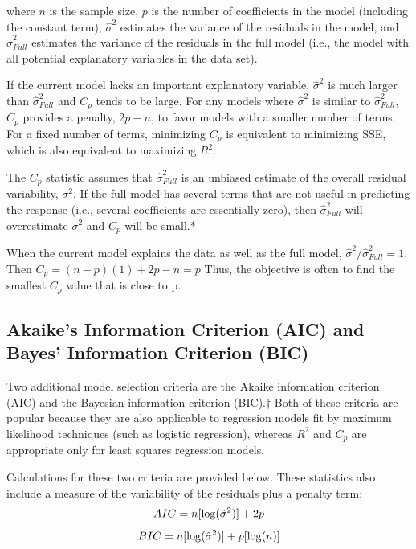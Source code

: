 \documentclass[
]{report}
\begin{document}
where \(n\) is the sample size, \(p\) is the number of coefficients in the model (including the constant term), \(\hat{\sigma}^2\) estimates the variance of the residuals in the model, and \(\hat{\sigma}^2_{Full}\) estimates the variance of the residuals in the full model (i.e., the model with all potential explanatory variables in the data set).

If the current model lacks an important explanatory variable, \(\hat{\sigma}^2\) is much larger than \(\hat{\sigma}^2_{Full}\) and \(C_p\) tends to be large. For any models where \(\hat{\sigma}^2\) is similar to \(\hat{\sigma}^2_{Full}\), \(C_p\) provides a penalty, \(2p - n\), to favor models with a smaller number of terms. For a fixed number of terms, minimizing \(C_p\) is equivalent to minimizing SSE, which is also equivalent to maximizing \(R^2\).

The \(C_p\) statistic assumes that \(\hat{\sigma}^2_{Full}\) is an unbiased estimate of the overall residual variability, \(\sigma^2\). If the full model has several terms that are not useful in predicting the response (i.e., several coefficients are essentially zero), then \(\hat{\sigma}^2_{Full}\) will overestimate \(\sigma^2\) and \(C_p\) will be small.*

When the current model explains the data as well as the full model, \(\hat{\sigma}^2 / \hat{\sigma}^2_{Full} = 1\). Then \(C_p = (n - p)(1) + 2p - n = p\) Thus, the objective is often to find the smallest \(C_p\) value that is close to p.

\hypertarget{akaikes-information-criterion-aic-and-bayes-information-criterion-bic}{%
\subsection*{Akaike's Information Criterion (AIC) and Bayes' Information Criterion (BIC)}\label{akaikes-information-criterion-aic-and-bayes-information-criterion-bic}}

Two additional model selection criteria are the Akaike information criterion (AIC) and the Bayesian information criterion (BIC).† Both of these criteria are popular because they are also applicable to regression models fit by maximum likelihood techniques (such as logistic regression), whereas \(R^2\) and \(C_p\) are appropriate only for least squares regression models.

Calculations for these two criteria are provided below. These statistics also include a measure of the variability of the residuals plus a penalty term:
\begin{equation}
AIC = n[\log(\hat{\sigma}^2)] + 2p \notag
\end{equation}
\begin{equation}
BIC = n[\log(\hat{\sigma}^2)] + p[\log(n)] \notag
\end{equation}
\end{document}
